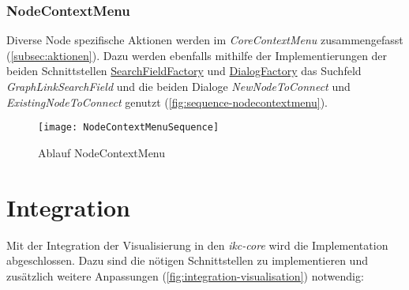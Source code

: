 \subsubsection{NodeContextMenu}
Diverse \gls{Node} spezifische Aktionen werden im \textit{CoreContextMenu} zusammengefasst (\autoref{subsec:aktionen}). Dazu werden ebenfalls mithilfe der Implementierungen der beiden Schnittstellen \hyperref[SearchFieldFactory]{SearchFieldFactory} und \hyperref[DialogFactory]{DialogFactory} das Suchfeld \textit{GraphLinkSearchField} und die beiden Dialoge \textit{NewNodeToConnect} und \textit{ExistingNodeToConnect} genutzt (\autoref{fig:sequence-nodecontextmenu}). 
\begin{figure}[htbp]
\centerline{\texttt{[image: NodeContextMenuSequence]}}
\caption{Ablauf NodeContextMenu}
\label{fig:sequence-nodecontextmenu}
\end{figure}

\section{Integration}
Mit der Integration der Visualisierung in den \textit{ikc-core} wird die Implementation abgeschlossen. Dazu sind die nötigen Schnittstellen zu implementieren und zusätzlich weitere Anpassungen  (\autoref{fig:integration-visualisation}) notwendig:

